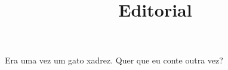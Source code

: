 %
% 
%
% 
% 
%

\title{Editorial}
\maketitle

Era uma vez um gato xadrez. Quer que eu conte outra vez?


